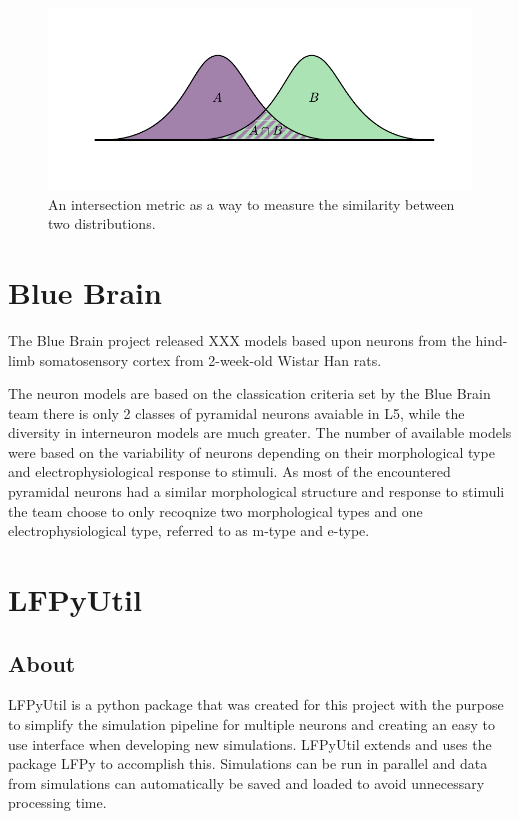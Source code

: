 \documentclass[altfont, fleqn]{uiophd}
\begin{document}
\begin{figure}[h]
    \begin{center}
        \includegraphics[width=1\textwidth]{images/sec_3/hist_inter.pdf}
        \caption{
            An intersection metric as a way to measure the similarity
            between two distributions.
        }
        \label{fig:3_hist_inter}
    \end{center}
\end{figure}
\section{Blue Brain}
The Blue Brain project released XXX models based upon neurons from 
the hind-limb somatosensory cortex
from 2-week-old Wistar Han rats.

The neuron models are based on the classication criteria set by the Blue Brain 
team there is only 2 classes of pyramidal neurons avaiable in L5, while
the diversity in interneuron models are much greater.
The number of available models were based on the variability of 
neurons depending on their morphological type and 
electrophysiological response to stimuli.
As most of the encountered pyramidal neurons had a similar morphological
structure and response to stimuli the team choose to only recoqnize
two morphological types and one electrophysiological type, 
referred to as m-type and e-type.


\section{LFPyUtil}
\subsection{About}
LFPyUtil is a python package that was created for this project with the purpose
to simplify the simulation pipeline for multiple neurons and creating
an easy to use interface when developing new simulations. 
LFPyUtil extends and uses the package LFPy to accomplish this. 
Simulations can be run in parallel and data from simulations can
automatically be saved and loaded to avoid unnecessary processing time.
\end{document}
